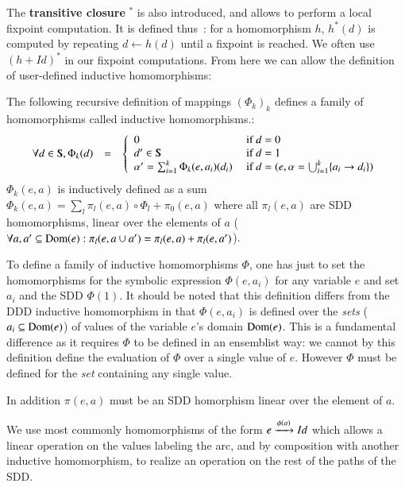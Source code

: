 The \textbf{transitive closure} $^*$ is also introduced, and allows to
perform a local fixpoint computation. It is defined thus~: for a
homomorphism $h$, $h^*(d)$ is computed by repeating $ d \leftarrow
h(d)$ until a fixpoint is reached. We often use $(h+ \mathit{Id})^*$
in our fixpoint computations. From here we can allow the definition of
user-defined inductive homomorphisms:

\begin{proposition}
\label{SDD:prop-hom-equation} 
The following recursive definition of mappings $(\Phi_k)_{k}$ defines
a family of homomorphisms called inductive homomorphisms.:
\[\begin{array}{lcl}
\forall d\in \SDD, \Phi_k(d)&=& \left\{\begin{array}{ll}
 0 & \mbox{ if } d = 0 \\ d' \in \SDD & \mbox{ if } d = 1 \\
\alpha' = \sum_{i=1}^k  \Phi_{k}(e,a_i) (d_i)
& \mbox{ if } d = (e,\alpha = \bigcup_{i=1}^k \{ a_i\rightarrow d_i\})
\\
\end{array}
\right. \\
\end{array}
\]
$\Phi_{k} (e,a)$ is inductively defined as a sum $ \Phi_{k} (e,a) =
\sum_{l} \pi_{l}(e,a) \circ \Phi_{l} + \pi_{0}(e,a) $ where all
$\pi_{l}(e,a)$ are SDD homomorphisms, linear over the elements of $a$
($\forall a,a' \subseteq \mathrm{Dom}(e):\pi_l(e,a \cup a') = \pi_l(e,a) +
\pi_l(e,a')$).
\end{proposition}


To define a family of inductive homomorphisms $\Phi$, one has just to
set the homomorphisms for the symbolic expression $\Phi (e,a_i)$ for
any variable $e$ and set $a_i$ and the SDD $\Phi(1)$. It should be
noted that this definition differs from the DDD inductive homomorphism
in that $\Phi(e,a_i)$ is defined over the
\emph{sets} ($a_i \subseteq \mathrm{Dom}(e)$) of values of the variable $e$'s domain
$\mathrm{Dom}(e)$. This is a fundamental difference as it requires $\Phi$ to
be defined in an ensemblist way: we cannot by this definition define
the evaluation of $\Phi$ over a single value of $e$. However $\Phi$
must be defined for the \emph{set} containing any single value.

In addition $\pi(e,a)$ must be an SDD homorphism linear over the
element of $a$.

We use most commonly homomorphisms of the form $e \xrightarrow{\scriptstyle {\phi(a)}}
Id$ which allows a linear operation on the values labeling the arc,
and by composition with another inductive homomorphism, to realize an
operation on the rest of the paths of the SDD.

